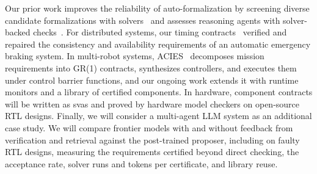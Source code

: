  Our prior work improves the reliability of auto-formalization by screening diverse candidate formalizations with solvers~\cite{ni2026draftprune} and assesses reasoning agents with solver-backed checks~\cite{ni2026agentified}. For distributed systems, our timing contracts~\cite{xiao2026memocode} verified and repaired the consistency and availability requirements of an automatic emergency braking system. In multi-robot systems, ACIES~\cite{xiao2026acies} decomposes mission requirements into GR(1) contracts, synthesizes controllers, and executes them under control barrier functions, and our ongoing work extends it with runtime monitors and a library of certified components. In hardware, component contracts will be written as \glspl{sva} and proved by hardware model checkers on open-source RTL designs. 
{Finally, we will consider a multi-agent LLM system as an additional case study.} We will compare frontier models with and without feedback from {verification} and retrieval against the post-trained proposer, including on faulty RTL designs, measuring the requirements certified beyond direct checking, the acceptance rate, solver runs and tokens per certificate, and library reuse.
